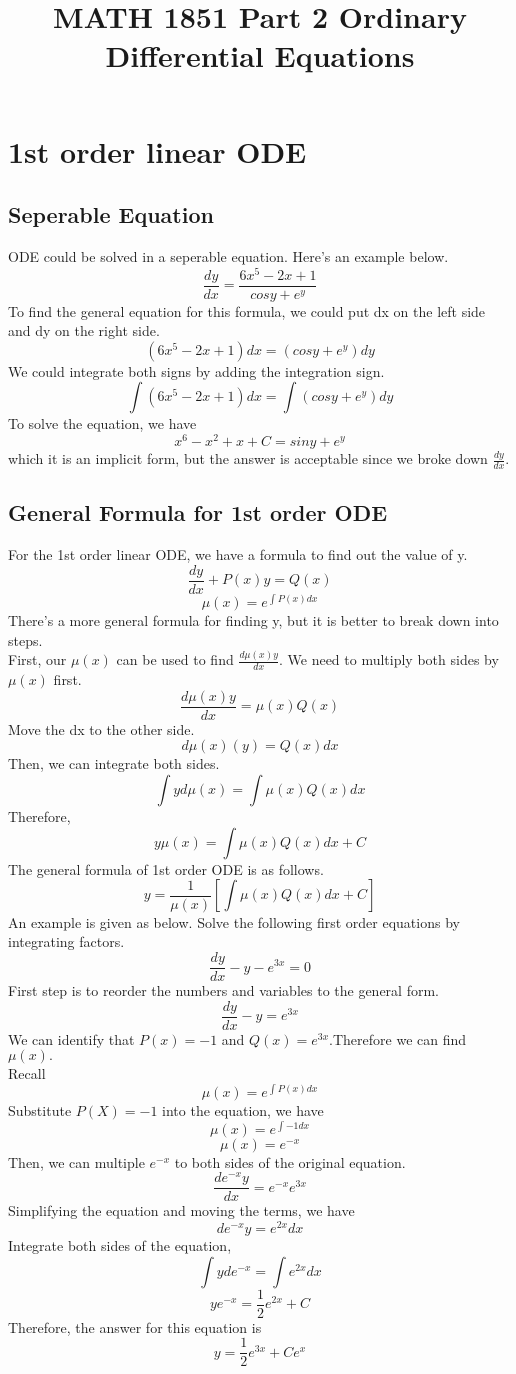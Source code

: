 \documentclass{article}
\title{MATH 1851 Part 2 Ordinary Differential Equations}
\begin{document}
\maketitle
\tableofcontents
\section{1st order linear ODE}
\subsection{Seperable Equation}
ODE could be solved in a seperable equation. Here's an example below.
$$\frac{dy}{dx} = \frac{6x^5-2x+1}{cosy + e^y}$$
To find the general equation for this formula, we could put dx on the left side and dy on the right side.
$$(6x^5-2x+1)dx = (cosy+e^y)dy$$
We could integrate both signs by adding the integration sign.
$$\int (6x^5-2x+1) dx = \int (cosy+e^y) dy$$
To solve the equation, we have
$$x^6-x^2+x+C = siny+e^y$$
which it is an implicit form, but the answer is acceptable since we broke down $\frac{dy}{dx}$.
\subsection{General Formula for 1st order ODE}
For the 1st order linear ODE, we have a formula to find out the value of y.
$$\frac{dy}{dx} + P(x)y = Q(x)$$ $$\mu (x) = e^{\int P(x)dx}$$
There's a more general formula for finding y, but it is better to break down
into steps.\\First, our $\mu (x)$ can be used to find $\frac{d\mu (x)y}{dx}$.
We need to multiply both sides by $\mu (x)$ first.
$$\frac{d\mu (x)y} {dx} = \mu (x)Q(x)$$
Move the dx to the other side.
$$d\mu(x)(y) = Q(x)dx$$
Then, we can integrate both sides.
$$\int yd\mu (x) = \int \mu (x)Q(x)dx$$
Therefore,
$$y\mu (x) = \int \mu (x)Q(x)dx + C$$
The general formula of 1st order ODE is as follows.
$$y = \frac {1}{\mu (x)} [\int \mu (x)Q(x)dx + C]$$
An example is given as below.
Solve the following first order equations by integrating factors.$$\frac{dy}{dx} - y - e^{3x} = 0$$
First step is to reorder the numbers and variables to the general form.
$$\frac{dy}{dx} - y = e^{3x}$$
We can identify that $P(x) = -1$ and $Q(x) = e^{3x}$.Therefore we can find $\mu (x).$ \\
Recall $$\mu (x) = e^{\int P(x)dx}$$
Substitute $P(X) = -1$ into the equation, we have
$$\mu (x) = e^{\int -1dx}$$
$$\mu (x) = e^{-x}$$
Then, we can multiple $e^{-x}$ to both sides of the original equation.
$$\frac{de^{-x}y}{dx} = e^{-x}{e^{3x}}$$
Simplifying the equation and moving the terms, we have
$$de^{-x}y = e^{2x}dx$$
Integrate both sides of the equation,
$$\int yde^{-x} = \int e^{2x}dx$$
$$ye^{-x} = \frac{1}{2}e^{2x} + C$$
Therefore, the answer for this equation is
$$y = \frac{1}{2} e^{3x} + Ce^{x}$$
\end{document}
